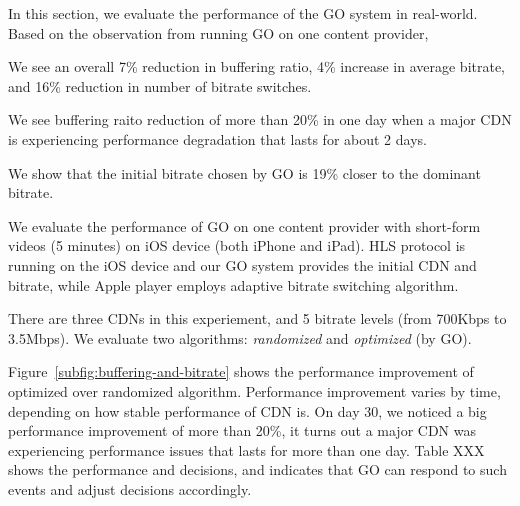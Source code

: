




\label{sec:eval}

In this section, we evaluate the performance of the GO system in real-world. Based on the observation from running GO on one content provider, 
\begin{packedenumerate}
    \item We see an overall 7\% reduction in buffering ratio, 4\% increase in average bitrate, and 16\% reduction in number of bitrate switches.
    \item We see buffering raito reduction of more than 20\% in one day when a major CDN is experiencing performance degradation that lasts for about 2 days.
    \item We show that the initial bitrate chosen by GO is 19\% closer to the dominant bitrate.
\end{packedenumerate}

\label{subsec:eval_setup}

We evaluate the performance of GO on one content provider with short-form videos (5 minutes) on iOS device (both iPhone and iPad). 
HLS protocol is running on the iOS device and our GO system provides the initial CDN and bitrate, while Apple player employs adaptive 
bitrate switching algorithm. 

There are three CDNs in this experiement, and 5 bitrate levels (from 700Kbps to 3.5Mbps). We evaluate two algorithms: {\it randomized} 
and {\it optimized} (by GO).


Figure~\ref{subfig:buffering-and-bitrate} shows the performance improvement of optimized over randomized algorithm. Performance improvement varies by time,
depending on how stable performance of CDN is. On day 30, we noticed a big performance improvement of more than 20\%,
it turns out a major CDN was experiencing performance issues that lasts for more than one day. Table XXX shows the 
performance and decisions, and indicates that GO can respond to such events and adjust decisions accordingly.

